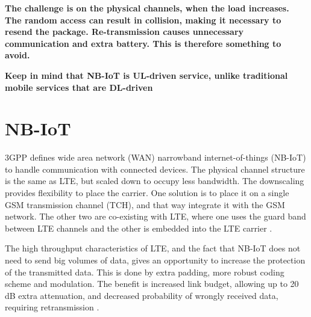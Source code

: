 \documentclass[10pt,a4paper,titlepage,twoside]{article}
\newcommand{\point}[1]{\textbf{\color{ymared} #1}}
\begin{document}


\vspace{2cm}

\point{The challenge is on the physical channels, when the load increases. The random access can result in collision, making it necessary to resend the package. Re-transmission causes unnecessary communication and extra battery. This is therefore something to avoid.}

\point{Keep in mind that NB-IoT is UL-driven service, unlike traditional mobile services that are DL-driven}

\clearpage
\section{NB-IoT}

3GPP defines wide area network (WAN) narrowband internet-of-things (NB-IoT) to handle communication with connected devices. The physical channel structure is the same as LTE, but scaled down to occupy less bandwidth. The downscaling provides flexibility to place the carrier. One solution is to place it on a single  GSM transmission channel (TCH), and that way integrate it with the GSM network. The other two are co-existing with LTE, where one uses the guard band between LTE channels and the other is embedded into the LTE carrier \cite{schlienz}.

The high throughput characteristics of LTE, and the fact that NB-IoT does not need to send big volumes of data, gives an opportunity to increase the protection of the transmitted data. This is done by extra padding, more robust coding scheme and modulation. The benefit is increased link budget, allowing up to 20 dB extra attenuation, and decreased probability of wrongly received data, requiring retransmission \cite{wang}.
\end{document}
